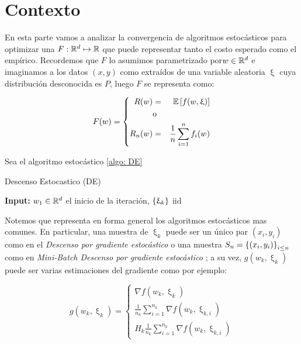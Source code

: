 \chapter{Contexto}\label{ch:contexto}

En esta parte vamos a analizar la convergencia de algoritmos estoc\'asticos para optimizar una $F: {\mathbb{R}}^d \mapsto {\mathbb{R}}$ que puede representar tanto el costo esperado como el emp\'irico. Recordemos que $F$ lo asumimos parametrizado por$w \in {\mathbb{R}}^d$ e imaginamos a los datos $(x,y)$ como extra\'idos de una variable aleatoria $\upxi$ cuya distribuci\'on desconocida es $P$, luego $F$ se representa como:

\begin{equation}
F(w) = \left\lbrace
\begin{aligned}
R(w) & = & \mathbb{E} \left[f(w, \upxi)\right] \\
& \text{o} & \\
R_n(w) & = & \frac{1}{n} \sum\limits_{i=1}^{n} {f_i(w)}
\end{aligned}
\right.
\end{equation}

Sea el algoritmo estoc\'astico \ref{algo: DE}

\LinesNumbered
\begin{algorithm}[H]
	\caption{Descenso Estocastico (DE) \label{algo: DE}}
	\textbf{Input:} $w_1 \in {\mathbb{R}}^d$ el inicio de la iteraci\'on, $\left\lbrace\upxi_{k}\right\rbrace $ iid \\
\end{algorithm}

Notemos que representa en forma general los algoritmos estoc\'asticos mas comunes. En particular, una muestra de $\upxi_k$ puede ser un \'unico par $(x_i, y_i)$ como en el \textit{Descenso por gradiente estoc\'astico} o una muestra $S_n = \left\lbrace(x_i, y_i)\right\rbrace_{i \leq n}$ como en \textit{Mini-Batch Descenso por gradiente estoc\'astico} ; a su vez, $g(w_k, \upxi_k)$ puede ser varias estimaciones del gradiente como por ejemplo:

\begin{equation}
g(w_k, \upxi_k) = \left\lbrace
\begin{aligned}
\nabla f(w_k, \upxi_k) \\
\frac{1}{n_k} \sum\limits_{i=1}^{n_k} {\nabla f (w_k, \upxi_{k,i})}\\
H_k\frac{1}{n_k} \sum\limits_{i=1}^{n_k} {\nabla f (w_k, \upxi_{k,i})}
\end{aligned}
\right.
\end{equation}

